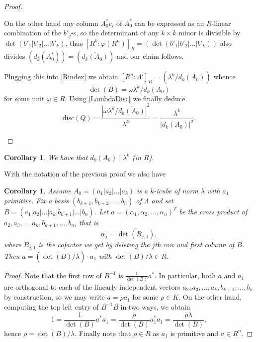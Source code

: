 \documentclass[11pt]{amsart}
\newcommand{\disc}{\mathrm{disc}}
\newtheorem{corollary}[proposition]{Corollary}
\theoremstyle{definition}
\theoremstyle{remark}
\begin{document}
\begin{proof}
\begin{enumerate}
On the other hand any column $A_0^*e_i$ of $A_0^*$ can be expressed as an $R$-linear combination of the $b'_j$-s, so the determinant of any $k\times k$ minor is divisible by $\det(b'_1|b'_2|\dots|b'_k)$, thus
$[R^k:\varphi(R^n)]_R=(\det(b'_1|b'_2|\dots|b'_k))$ also divides $(d_k(A_0^*))=(\overline{d_k(A_0)})$ and our claim follows.

Plugging this into \eqref{Rindex} we obtain $[R^n:\Lambda']_R=(\lambda^k/\overline{d_k(A_0)})$ whence
\begin{equation}\label{detBuptounit}
\det(B)=\omega\lambda^k/\overline{d_k(A_0)} 
\end{equation}
for some unit $\omega\in R$. Using \eqref{LambdaDisc} we finally deduce
\begin{equation}\label{discQform}
\disc(Q)=\frac{|\omega\lambda^k/\overline{d_k(A_0)}|^2}{\lambda^k}=\frac{\lambda^k}{|d_k(A_0)|^2}.
\end{equation}
\end{enumerate}
\end{proof}

\begin{corollary}
We have that $d_k(A_0)\mid \lambda^k$ (in $R$).
\end{corollary}

With the notation of the previous proof we also have

\begin{corollary}\label{crossproductcor}
Assume $A_0=(a_1|a_2|\dots|a_k)$ is a $k$-icube of norm $\lambda$ with $a_1$ primitive. Fix a basis $(b_{k+1},b_{k+2},\dots,b_n)$ of $\Lambda$ and set $B=(a_1|a_2|\dots|a_k|b_{k+1}|\dots|b_n)$. Let $a=(\alpha_1,\alpha_2,\dots,\alpha_n)^T$ be the cross product of $a_2,a_3,\dots,a_k,b_{k+1},\dots,b_n$, that is
\[\alpha_j=\overline{\det (B_{j,1})} ,\]
where $B_{j,1}$ is the cofactor we get by deleting the $j$th row and first column of $B$. Then $a=(\overline{\det(B)}/\lambda)\cdot a_1$ with $\overline{\det(B)}/\lambda\in R$.
\end{corollary}

\begin{proof}
Note that the first row of $B^{-1}$ is $\frac{1}{\det (B)}a^*$. In particular, both $a$ and $a_1$ are orthogonal to each of the linearly independent vectors $a_2,a_3,\dots,a_k, b_{k+1},\dots,b_n$ by construction,
so we may write $a=\rho a_1$ for some $\rho\in K$. On the other hand, computing the top left entry of $B^{-1}B$ in two ways, we obtain
\begin{equation}\label{computerho}
1=\frac{1}{\det(B)}a^*a_1=\frac{\overline{\rho}}{\det(B)}a_1^*a_1=\frac{\overline{\rho}\lambda}{\det(B)},
\end{equation}
hence $\rho=\overline{\det(B)}/\lambda$. Finally note that $\rho\in R$ as $a_1$ is primitive and $a\in R^n$.
\end{proof}
\end{document}
